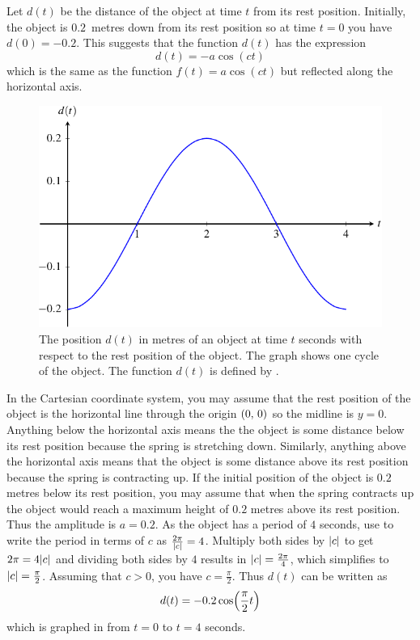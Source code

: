 \documentclass[a4paper,oneside,12pt]{article}
\begin{document}
\begin{problem}
{\begin{solution}
Let $d(t)$ be the distance of the object at time $t$ from its rest
position.  Initially, the object is $0.2$~metres down from its rest
position so at time $t = 0$ you have $d(0) = -0.2$.  This suggests
that the function $d(t)$ has the expression
\[
d(t)
=
-a \cos(ct)
\]
which is the same as the function $f(t) = a \cos(ct)$ but reflected
along the horizontal axis.

\begin{figure}[!htbp]
\centering
\includegraphics[scale=1.1]{image/13/spring-displacement.pdf}
\caption{%
  The position $d(t)$ in metres of an object at time $t$ seconds with
  respect to the rest position of the object.  The graph shows one
  cycle of the object.  The function $d(t)$ is defined by
  .
}
\label{fig:trigonometric:spring_displacement}
\end{figure}

In the Cartesian coordinate system, you may assume that the rest
position of the object is the horizontal line through the origin
$\left\lparen{0},\, {0}\right\rparen$ so the midline is $y = 0$.  Anything below the
horizontal axis means the the object is some distance below its rest
position because the spring is stretching down.  Similarly, anything
above the horizontal axis means that the object is some distance above
its rest position because the spring is contracting up.  If the
initial position of the object is $0.2$ metres below its rest
position, you may assume that when the spring contracts up the object
would reach a maximum height of $0.2$ metres above its rest position.
Thus the amplitude is $a = 0.2$.  As the object has a period of $4$
seconds, use  to
write the period in terms of $c$ as
$\frac{2\pi}{\lvert c\rvert} = 4$.  Multiply both sides by
$\lvert c\rvert$ to get $2\pi = 4\lvert c\rvert$ and dividing
both sides by $4$ results in $\lvert c\rvert = \frac{2\pi}{4}$,
which simplifies to $\lvert c\rvert = \frac{\pi}{2}$.  Assuming
that $c > 0$, you have $c = \frac{\pi}{2}$.  Thus $d(t)$ can be
written as
\begin{equation}
\label{eqn:trigonometric:spring_displacement}
d(t)
=
-0.2 \cosp{\frac{\pi}{2} t}
\end{equation}
which is graphed in 
from $t = 0$ to $t = 4$ seconds.


\end{solution}}
\end{problem}
\end{document}
